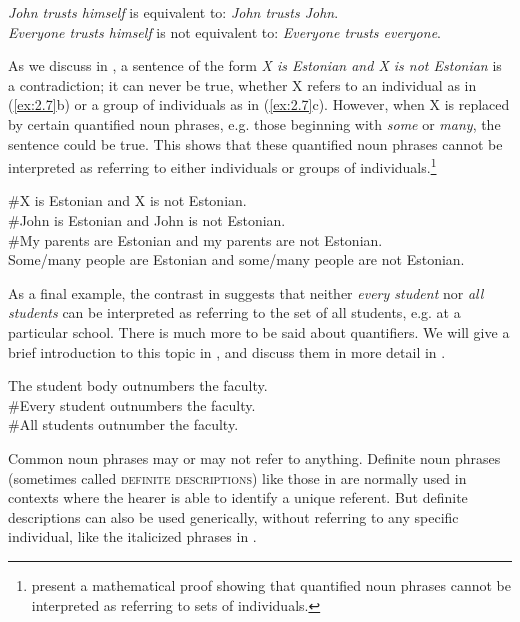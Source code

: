 \ea \label{ex:2.6}
\ea \textit{John trusts himself}  is equivalent to:  \textit{John trusts John}.\\
\ex \textit{Everyone trusts himself}  is not equivalent to:  \textit{Everyone trusts everyone}.
\z
\z


As we discuss in , a sentence of the form \textit{X is Estonian and X is not Estonian} is a contradiction; it can never be true, whether X refers to an individual as in (\ref{ex:2.7}b) or a group of individuals as in (\ref{ex:2.7}c). However, when X is replaced by certain quantified noun phrases, e.g. those beginning with \textit{some} or \textit{many}, the sentence could be true. This shows that these quantified noun phrases cannot be interpreted as referring to either individuals or groups of individuals.\footnote{\citet[49–52]{PetersWesterståhl2006} present a mathematical proof showing that quantified noun phrases cannot be interpreted as referring to sets of individuals.}


\ea  \label{ex:2.7}
\ea \#X is Estonian and X is not Estonian.\\
\ex \#John is Estonian and John is not Estonian.\\
\ex \#My parents are Estonian and my parents are not Estonian.\\
\ex Some/many people are Estonian and some/many people are not Estonian.
\z
\z


As a final example, the contrast in  suggests that neither \textit{every student} nor \textit{all students} can be interpreted as referring to the set of all students, e.g. at a particular school. There is much more to be said about quantifiers. We will give a brief introduction to this topic in , and discuss them in more detail in .


\ea \label{ex:2.8}
\ea The student body outnumbers the faculty.\\                
\ex \#Every student outnumbers the faculty.\\
\ex \#All students outnumber the faculty.
\z
\z

\begin{sloppypar}
Common noun phrases may or may not refer to anything. Definite noun phrases (sometimes called \textsc{definite descriptions}) like those in  are normally used in contexts where the hearer is able to identify a unique referent. But definite descriptions can also be used generically, without referring to any specific individual, like the italicized phrases in .
\end{sloppypar}


